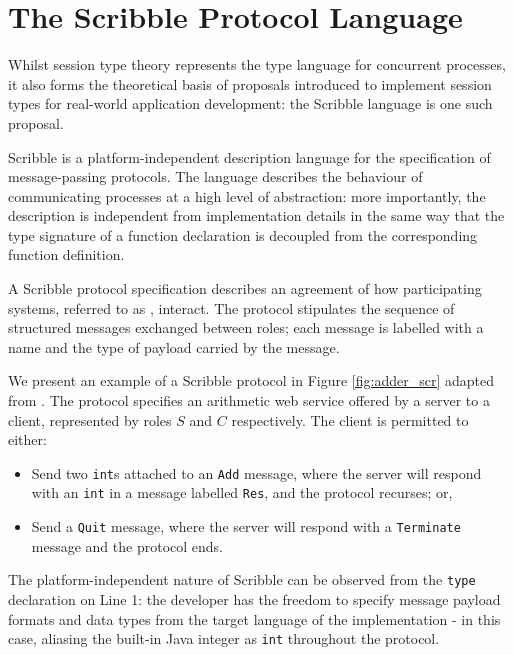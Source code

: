 \section{The Scribble Protocol Language}

Whilst session type theory represents the type language for concurrent processes, it also forms the theoretical basis of proposals introduced to implement session types for real-world application development: the Scribble language is one such proposal.

Scribble \cite{Scribble} is a platform-independent description language for the specification of message-passing protocols. The language describes the behaviour of communicating processes at a high level of abstraction: more importantly, the description is independent from implementation details in the same way that the type signature of a function declaration is decoupled from the corresponding function definition.

A Scribble protocol specification describes an agreement of how participating systems, referred to as , interact. The protocol stipulates the sequence of structured messages exchanged between roles; each message is labelled with a name and the type of payload carried by the message.

We present an example of a Scribble protocol in Figure \ref{fig:adder_scr} adapted from \cite{Hybrid2016}. The protocol specifies an arithmetic web service offered by a server to a client, represented by roles $S$ and $C$ respectively. The client is permitted to either:

\begin{itemize}
\item Send two \texttt{int}s attached to an \texttt{Add} message, where the server will respond with an \texttt{int} in a message labelled \texttt{Res}, and the protocol recurses; or,
\item Send a \texttt{Quit} message, where the server will respond with a \texttt{Terminate} message and the protocol ends.
\end{itemize}

The platform-independent nature of Scribble can be observed from the \texttt{type} declaration on Line 1: the developer has the freedom to specify message payload formats and data types from the target language of the implementation - in this case, aliasing the built-in Java integer as \texttt{int} throughout the protocol.

